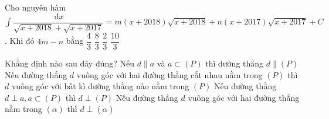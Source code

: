 \begin{ex}%
Cho nguyên hàm\\
$\displaystyle\int{\dfrac{\mathrm{\,d}x}{\sqrt{x+2018}+\sqrt{x+2017}}=m(x+2018)\sqrt{x+2018}+n(x+2017)\sqrt{x+2017}+C}$. Khi đó $4m-n$ bằng
\choice
{ $\dfrac{4}{3}$ }
{ $\dfrac{8}{3}$}
{ $\dfrac{2}{3}$}
{\True $\dfrac{10}{3}$}
\end{ex}
\begin{ex}%
Khẳng định nào sau đây đúng?
\choice
{ Nếu $d\parallel a$ và $a\subset ( P )$ thì đường thẳng $d \parallel  (P)$}
{\True Nếu đường thẳng $d$ vuông góc với hai đường thẳng cắt nhau nằm trong $(P)$ thì $d$ vuông góc với bất kì đường thẳng nào nằm trong $(P)$}
{ Nếu đường thẳng $d\perp a, a\subset ( P )$ thì $d\perp ( P )$ }
{ Nếu đường thẳng $d$ vuông góc với hai đường thẳng nằm trong $(\alpha)$ thì $d\perp (\alpha)$}
\end{ex}
